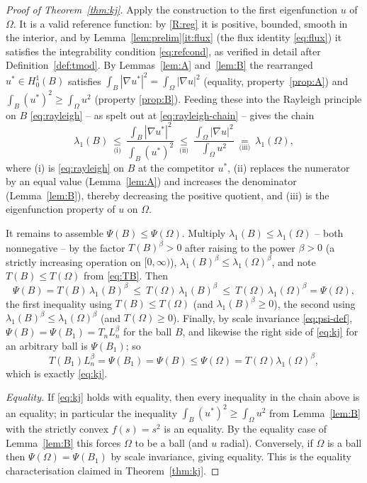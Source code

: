 \documentclass[11pt]{amsart}
\theoremstyle{definition}
\newcommand{\Om}{\Omega}
\newcommand{\abs}[1]{\left|#1\right|}
\begin{document}
\begin{proof}[Proof of Theorem~\ref{thm:kj}]
Apply the construction to the first eigenfunction $u$ of $\Om$. It is a
valid reference function: by \ref{R:reg} it is positive, bounded, smooth in
the interior, and by Lemma~\ref{lem:prelim}\ref{it:flux} (the flux identity
\eqref{eq:flux}) it satisfies the integrability condition
\eqref{eq:refcond}, as verified in detail after Definition~\ref{def:tmod}.
By Lemmas~\ref{lem:A} and~\ref{lem:B} the rearranged $u^*\in H^1_0(B)$
satisfies $\int_B\abs{\nabla u^*}^2=\int_\Om\abs{\nabla u}^2$ (equality,
property~\ref{prop:A}) and $\int_B(u^*)^2\ge\int_\Om u^2$ (property
\ref{prop:B}). Feeding these into the Rayleigh principle on $B$
\eqref{eq:rayleigh} -- as spelt out at \eqref{eq:rayleigh-chain} -- gives the
chain
\[
  \lambda_1(B)
  \ \underset{\text{(i)}}{\le}\
  \frac{\int_B\abs{\nabla u^*}^2}{\int_B(u^*)^2}
  \ \underset{\text{(ii)}}{\le}\
  \frac{\int_\Om\abs{\nabla u}^2}{\int_\Om u^2}
  \ \underset{\text{(iii)}}{=}\
  \lambda_1(\Om),
\]
where (i) is \eqref{eq:rayleigh} on $B$ at the competitor $u^*$, (ii)
replaces the numerator by an equal value (Lemma~\ref{lem:A}) and increases
the denominator (Lemma~\ref{lem:B}), thereby decreasing the positive
quotient, and (iii) is the eigenfunction property of $u$ on $\Om$.

It remains to assemble $\Psi(B)\le\Psi(\Om)$. Multiply
$\lambda_1(B)\le\lambda_1(\Om)$ -- both nonnegative -- by the factor
$T(B)^{\beta}>0$ after raising to the power $\beta>0$ (a strictly increasing
operation on $[0,\infty)$), $\lambda_1(B)^\beta\le\lambda_1(\Om)^\beta$, and
note $T(B)\le T(\Om)$ from \eqref{eq:TB}. Then
\[
  \Psi(B)=T(B)\,\lambda_1(B)^\beta
  \ \le\ T(\Om)\,\lambda_1(B)^\beta
  \ \le\ T(\Om)\,\lambda_1(\Om)^\beta=\Psi(\Om),
\]
the first inequality using $T(B)\le T(\Om)$ (and $\lambda_1(B)^\beta\ge0$),
the second using $\lambda_1(B)^\beta\le\lambda_1(\Om)^\beta$ (and
$T(\Om)\ge0$). Finally, by scale invariance \eqref{eq:psi-def},
$\Psi(B)=\Psi(B_1)=T_n L_n^\beta$ for the ball $B$, and likewise the right
side of \eqref{eq:kj} for an arbitrary ball is $\Psi(B_1)$; so
\[
  T(B_1)L_n^\beta=\Psi(B_1)=\Psi(B)\le\Psi(\Om)=T(\Om)\lambda_1(\Om)^\beta,
\]
which is exactly \eqref{eq:kj}.

\emph{Equality.} If \eqref{eq:kj} holds with equality, then every
inequality in the chain above is an equality; in particular the inequality
$\int_B(u^*)^2\ge\int_\Om u^2$ from Lemma~\ref{lem:B} with the strictly
convex $f(s)=s^2$ is an equality. By the equality case of Lemma~\ref{lem:B}
this forces $\Om$ to be a ball (and $u$ radial). Conversely, if $\Om$ is a
ball then $\Psi(\Om)=\Psi(B_1)$ by scale invariance, giving equality. This
is the equality characterisation claimed in Theorem~\ref{thm:kj}.
\end{proof}
\end{document}
